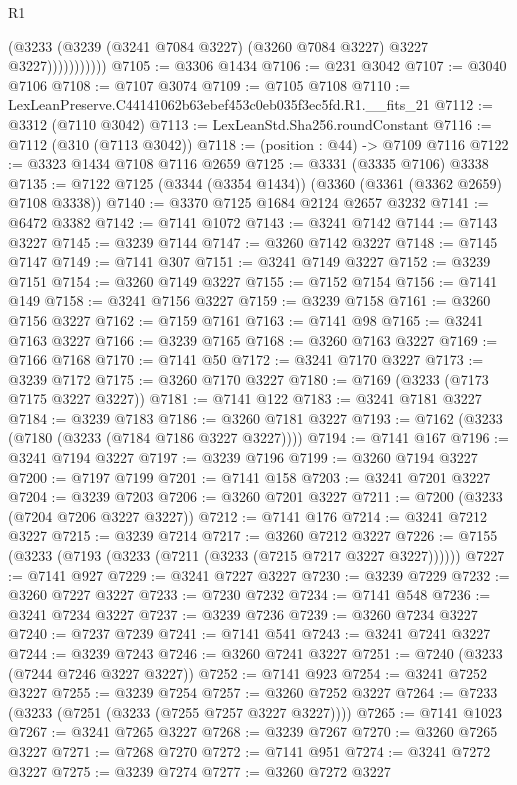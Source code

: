\begin{lexlean}{R1}
\begin{coremodule}
                      (@3233 (@3239 (@3241 @7084 @3227) (@3260 @7084 @3227) @3227 @3227)))))))))))
@7105 := @3306 @1434
@7106 := @231 @3042
@7107 := @3040 @7106
@7108 := @7107 @3074
@7109 := @7105 @7108
@7110 := LexLeanPreserve.C44141062b63ebef453c0eb035f3ec5fd.R1.__fits_21
@7112 := @3312 (@7110 @3042)
@7113 := LexLeanStd.Sha256.roundConstant
@7116 := @7112 (@310 (@7113 @3042))
@7118 := (position : @44) -> @7109 @7116
@7122 := @3323 @1434 @7108 @7116 @2659
@7125 := @3331 (@3335 @7106) @3338
@7135 := @7122 @7125 (@3344 (@3354 @1434)) (@3360 (@3361 (@3362 @2659) @7108 @3338))
@7140 := @3370 @7125 @1684 @2124 @2657 @3232
@7141 := @6472 @3382
@7142 := @7141 @1072
@7143 := @3241 @7142
@7144 := @7143 @3227
@7145 := @3239 @7144
@7147 := @3260 @7142 @3227
@7148 := @7145 @7147
@7149 := @7141 @307
@7151 := @3241 @7149 @3227
@7152 := @3239 @7151
@7154 := @3260 @7149 @3227
@7155 := @7152 @7154
@7156 := @7141 @149
@7158 := @3241 @7156 @3227
@7159 := @3239 @7158
@7161 := @3260 @7156 @3227
@7162 := @7159 @7161
@7163 := @7141 @98
@7165 := @3241 @7163 @3227
@7166 := @3239 @7165
@7168 := @3260 @7163 @3227
@7169 := @7166 @7168
@7170 := @7141 @50
@7172 := @3241 @7170 @3227
@7173 := @3239 @7172
@7175 := @3260 @7170 @3227
@7180 := @7169 (@3233 (@7173 @7175 @3227 @3227))
@7181 := @7141 @122
@7183 := @3241 @7181 @3227
@7184 := @3239 @7183
@7186 := @3260 @7181 @3227
@7193 := @7162 (@3233 (@7180 (@3233 (@7184 @7186 @3227 @3227))))
@7194 := @7141 @167
@7196 := @3241 @7194 @3227
@7197 := @3239 @7196
@7199 := @3260 @7194 @3227
@7200 := @7197 @7199
@7201 := @7141 @158
@7203 := @3241 @7201 @3227
@7204 := @3239 @7203
@7206 := @3260 @7201 @3227
@7211 := @7200 (@3233 (@7204 @7206 @3227 @3227))
@7212 := @7141 @176
@7214 := @3241 @7212 @3227
@7215 := @3239 @7214
@7217 := @3260 @7212 @3227
@7226 := @7155 (@3233 (@7193 (@3233 (@7211 (@3233 (@7215 @7217 @3227 @3227))))))
@7227 := @7141 @927
@7229 := @3241 @7227 @3227
@7230 := @3239 @7229
@7232 := @3260 @7227 @3227
@7233 := @7230 @7232
@7234 := @7141 @548
@7236 := @3241 @7234 @3227
@7237 := @3239 @7236
@7239 := @3260 @7234 @3227
@7240 := @7237 @7239
@7241 := @7141 @541
@7243 := @3241 @7241 @3227
@7244 := @3239 @7243
@7246 := @3260 @7241 @3227
@7251 := @7240 (@3233 (@7244 @7246 @3227 @3227))
@7252 := @7141 @923
@7254 := @3241 @7252 @3227
@7255 := @3239 @7254
@7257 := @3260 @7252 @3227
@7264 := @7233 (@3233 (@7251 (@3233 (@7255 @7257 @3227 @3227))))
@7265 := @7141 @1023
@7267 := @3241 @7265 @3227
@7268 := @3239 @7267
@7270 := @3260 @7265 @3227
@7271 := @7268 @7270
@7272 := @7141 @951
@7274 := @3241 @7272 @3227
@7275 := @3239 @7274
@7277 := @3260 @7272 @3227

\end{coremodule}
\end{lexlean}
